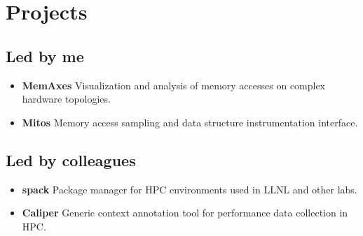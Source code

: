 \section{Projects}

\subsection{Led by me}

\begin{itemize}

\item \textbf{MemAxes} Visualization and analysis of memory accesses on complex hardware topologies.

\item \textbf{Mitos} Memory access sampling and data structure instrumentation interface.

\end{itemize}

\subsection{Led by colleagues}

\begin{itemize}

\item \textbf{spack} Package manager for HPC environments used in LLNL and other labs.

\item \textbf{Caliper} Generic context annotation tool for performance data collection in HPC.

\end{itemize}

